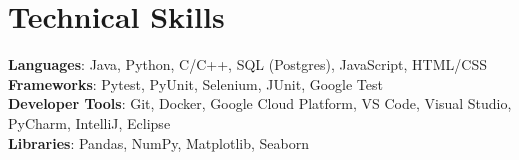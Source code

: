 \documentclass[letterpaper,11pt]{article}
\begin{document}
    \section{Technical Skills}
    \label{sec:technicalskills}
    \begin{itemize}[leftmargin=0.15in, label={}]
        \small{\item{
            \textbf{Languages}{: Java, Python, C/C++, SQL (Postgres), JavaScript, HTML/CSS} \\
            \textbf{Frameworks}{: Pytest, PyUnit, Selenium, JUnit, Google Test} \\
            \textbf{Developer Tools}{: Git, Docker, Google Cloud Platform, VS Code, Visual Studio, PyCharm, IntelliJ, Eclipse} \\
            \textbf{Libraries}{: Pandas, NumPy, Matplotlib, Seaborn}
        }}
    \end{itemize}

\end{document}
